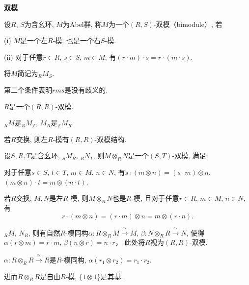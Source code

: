 \begin{definition}  \textbf{双模}\par
    \qquad 设$R$, $S$为含幺环, $M$为Abel群, 称$M$为一个$(R,S)$-双模（bimodule）, 若\par
    \qquad \qquad (i) $M$是一个左$R$-模, 也是一个右$S$-模.\par
    \qquad \qquad (ii) 对于任意$r\in R$, $s\in S$, $m\in M$, 
    有$(r\cdot m)\cdot s=r\cdot (m\cdot s)$.\par
将$M$简记为$_RM_S$.
\end{definition}

\begin{remark}
    第二个条件表明$rms$是没有歧义的.
\end{remark}

\begin{example}
    $R$是一个$(R,R)$-双模.
\end{example}

\begin{example}
    $_RM$是$_RM_\mathbb{Z}$, $M_R$是$_\mathbb{Z}M_R$.
\end{example}

\begin{example}
    若$R$交换, 则左$R$-模有$(R,R)$-双模结构.
\end{example}

\begin{proposition}
    设$S,R,T$是含幺环, $_SM_R$, $_RN_T$, 则$M\otimes_R N$是一个$(S,T)$-双模, 满足:\par
    \qquad 对于任意$s\in S$, $t\in T$, $m\in M$, $n\in N$, 
    有$s\cdot (m\otimes n)=(s\cdot m)\otimes n$, 
    $(m\otimes n) \cdot t=m \otimes (n\cdot t)$.
\end{proposition}

\begin{corollary}
    若$R$交换, $M,N$是左$R$-模, 则$M\otimes_R N$也是$R$-模, 
    且对于任意$r\in R$, $m\in M$, $n\in N$, 有
    $$r\cdot (m\otimes n)=(r\cdot m)\otimes n=m\otimes (r\cdot n).$$
\end{corollary}

\begin{proposition}
    $_RM$, $N_R$, 则有自然$R$-模同构$\alpha: R\otimes_R M \xrightarrow{\cong} M$, 
    $\beta: N\otimes_R R \xrightarrow{\cong} N$, 使得
    $\alpha(r\otimes m)=r\cdot m$, $\beta(n\otimes r)=n\cdot r$，
    此处将$R$视为$(R,R)$-双模.
\end{proposition}

\begin{corollary}
    $\alpha: R\otimes_R R\xrightarrow{\cong} R$是$R$-模同构, 
    $\alpha(r_1\otimes r_2)=r_1\cdot r_2$.\par
    \qquad 进而$R\otimes_R R$是自由$R$-模, $\{1\otimes 1\}$是其基.
\end{corollary}

